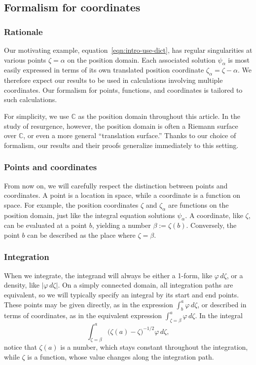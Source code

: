 \documentclass[review]{siamart220329}
\newcommand{\C}{\mathbb{C}}
\begin{document}
\subsection{Formalism for coordinates}
\subsubsection{Rationale}
Our motivating example, equation~\eqref{eqn:intro-use-dict}, has regular singularities at various points $\zeta = \alpha$ on the position domain. Each associated solution $\psi_\alpha$ is most easily expressed in terms of its own translated position coordinate $\zeta_\alpha = \zeta - \alpha$. We therefore expect our results to be used in calculations involving multiple coordinates. Our formalism for points, functions, and coordinates is tailored to such calculations.

For simplicity, we use $\C$ as the position domain throughout this article. In the study of resurgence, however, the position domain is often a Riemann surface over $\C$, or even a more general ``translation surface.'' Thanks to our choice of formalism, our results and their proofs generalize immediately to this setting.
\subsubsection{Points and coordinates}
From now on, we will carefully respect the distinction between points and coordinates. A point is a location in space, while a coordinate is a function on space. For example, the position coordinates $\zeta$ and $\zeta_\alpha$ are functions on the position domain, just like the integral equation solutions $\psi_\alpha$. A coordinate, like $\zeta$, can be evaluated at a point $b$, yielding a number $\beta := \zeta(b)$. Conversely, the point $b$ can be described as the place where $\zeta = \beta$.
\subsubsection{Integration}
When we integrate, the integrand will always be either a 1-form, like $\varphi\,d\zeta$, or a density, like $|\varphi\,d\zeta|$. On a simply connected domain, all integration paths are equivalent, so we will typically specify an integral by its start and end points. These points may be given directly, as in the expression $\int_b^a \varphi\,d\zeta$, or described in terms of coordinates, as in the equivalent expression $\int_{\zeta = \beta}^a \varphi\,d\zeta$. In the integral
\[ \int_{\zeta = \beta}^a \big(\zeta(a) - \zeta\big)^{-1/2} \varphi\,d\zeta, \]
notice that $\zeta(a)$ is a number, which stays constant throughout the integration, while $\zeta$ is a function, whose value changes along the integration path.
\end{document}

